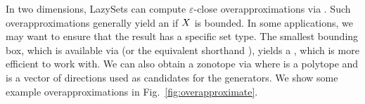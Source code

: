 In two dimensions, LazySets can compute $\varepsilon$-close overapproximations via .
Such overapproximations generally yield an  if $X$ is bounded.
In some applications, we may want to ensure that the result has a specific set type.
The smallest bounding box, which is available via  (or the equivalent shorthand ), yields a , which is more efficient to work with.
%
We can also obtain a zonotope via  where  is a polytope and  is a vector of directions used as candidates for the generators.
We show some example overapproximations in Fig.~\ref{fig:overapproximate}.
